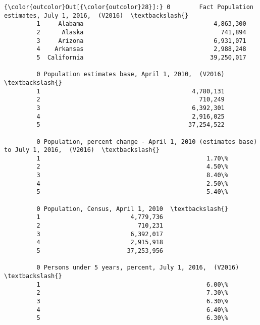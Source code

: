 \documentclass[11pt]{article}
\begin{document}
\begin{Verbatim}[commandchars=\\\{\}]
{\color{outcolor}Out[{\color{outcolor}28}]:} 0        Fact Population estimates, July 1, 2016,  (V2016)  \textbackslash{}
         1     Alabama                                    4,863,300   
         2      Alaska                                      741,894   
         3     Arizona                                    6,931,071   
         4    Arkansas                                    2,988,248   
         5  California                                   39,250,017   
         
         0 Population estimates base, April 1, 2010,  (V2016)  \textbackslash{}
         1                                          4,780,131   
         2                                            710,249   
         3                                          6,392,301   
         4                                          2,916,025   
         5                                         37,254,522   
         
         0 Population, percent change - April 1, 2010 (estimates base) to July 1, 2016,  (V2016)  \textbackslash{}
         1                                              1.70\%                                      
         2                                              4.50\%                                      
         3                                              8.40\%                                      
         4                                              2.50\%                                      
         5                                              5.40\%                                      
         
         0 Population, Census, April 1, 2010  \textbackslash{}
         1                         4,779,736   
         2                           710,231   
         3                         6,392,017   
         4                         2,915,918   
         5                        37,253,956   
         
         0 Persons under 5 years, percent, July 1, 2016,  (V2016)  \textbackslash{}
         1                                              6.00\%       
         2                                              7.30\%       
         3                                              6.30\%       
         4                                              6.40\%       
         5                                              6.30\%       
         

\end{Verbatim}
\end{document}
